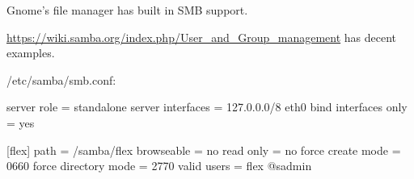 Gnome's file manager has built in SMB support.

\url{https://wiki.samba.org/index.php/User_and_Group_management} has decent
examples.

/etc/samba/smb.conf:

   server role = standalone server
interfaces = 127.0.0.0/8 eth0
bind interfaces only = yes


[flex]
    path = /samba/flex
    browseable = no
    read only = no
    force create mode = 0660
    force directory mode = 2770
    valid users = flex @sadmin
